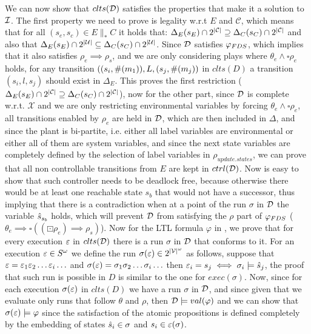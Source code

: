 We can now show that $clts(\mathcal{D})$ satisfies the properties that make it a solution to $\mathcal{I}$. The first property we need to prove is legality w.r.t $E$ and $\mathcal{C}$, which means that for all $(s_e,s_c) \in E \parallel_* C$ it holds that:
$\Delta_{E}(s_E)\cap 2^{|\mathcal{C}|} \supseteq \Delta_{C}(s_C)\cap 2^{|\mathcal{C}|}$ and also that  $\Delta_{E}(s_E)\cap 2^{|\mathcal{U}|} \subseteq \Delta_{C}(s_C)\cap 2^{|\mathcal{U}|}$. Since $\mathcal{D}$ satisfies $\varphi_{FDS}$, which implies that it also satisfies $\rho_e \implies \rho_s$, and we are only considering plays where $\theta_e \wedge \square \rho_e$ holds, for any transition $((s_i, \#(m_1)),L,(s_j,\#(m_j))$ in $clts(D)$ a transition $(s_i, l, s_j)$ should exist in $\Delta_E$. This proves the first restriction ($\Delta_{E}(s_E)\cap 2^{|\mathcal{C}|} \supseteq \Delta_{C}(s_C)\cap 2^{|\mathcal{C}|}$), now for the other part, since $\mathcal{D}$ is complete w.r.t. $\mathcal{X}$ and we are only restricting environmental variables by forcing $\theta_e \wedge \square\rho_e$, all transitions enabled by $\rho_e$ are held in $\mathcal{D}$, which are then included in $\Delta$, and since the plant is bi-partite, i.e. either all label variables are environmental or either all of them are system variables, and since the next state variables are completely defined by the selection of label variables in $\rho_{update.states}$, we can prove that all non controllable transitions from $E$ are kept in $ctrl(\mathcal{D})$. Now is easy to show that such controller needs to be deadlock free, because otherwise there would be at least one reachable state $s_b$ that would not have a successor, thus implying that there is a contradiction when at a point of the run $\sigma$ in $\mathcal{D}$ the variable $\hat{s}_{s_b}$ holds, which will prevent $\mathcal{D}$ from satisfying the $\rho$ part of $\varphi_{FDS}$ ($\theta_e \implies \square((\boxdot \rho_e) \implies \rho_s)$).  
Now for the LTL formula $\varphi$ in \controlProblem, we prove that for every execution $\varepsilon$ in $clts(\mathcal{D})$ there is a run $\sigma$ in $\mathcal{D}$ that conforms to it.
For an execution $\varepsilon \in S^{\omega}$ we define the run $\sigma(\varepsilon) \in 2^{|\mathcal{V}|^{\omega}}$ as follows, suppose that $\varepsilon= \varepsilon_1 \varepsilon_2 \ldots \varepsilon_i \ldots$ and $\sigma(\varepsilon) = \sigma_1 \sigma_2 \ldots \sigma_i \ldots$ 
 then $\varepsilon_i = s_j \iff \sigma_i \models \hat{s}_{j}$, the proof that such run is possible in $D$ is similar to the one for $exec(\sigma)$.
Now, since for each execution $\sigma(\varepsilon)$ in $clts(D)$ we have a run $\sigma$ in $\mathcal{D}$, and since given that we evaluate only runs that follow $\theta$ and $\rho$, then $\mathcal{D} \models val(\varphi)$ and we can show that $\sigma(\varepsilon) \models \varphi$ since the satisfaction of the atomic propositions is defined completely by the embedding of states $\hat{s}_{i} \in \sigma$ and $s_i \in \varepsilon(\sigma)$.